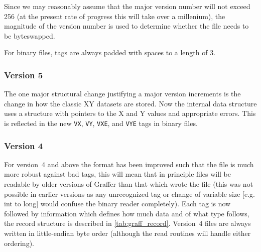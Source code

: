 \documentclass[english]{article}
\begin{document}
Since we may reasonably assume that the major version number will not
exceed 256 (at the present rate of progress this will take over a
millenium), the magnitude of the version number is used to determine
whether the file needs to be byteswapped.

For binary files, tags are always padded with spaces to a length
of 3. 

\subsubsection{Version 5}
\label{sec:bin_v5}

The one major structural change justifying a major version increments
is the change in how the classic XY datasets are stored. Now the
internal data structure uses a structure with pointers to the X and Y
values and appropriate errors. This is reflected in the new \texttt{VX},
\texttt{VY}, \texttt{VXE}, and \texttt{VYE} tags in binary files.

\subsubsection{Version 4}
\label{sec:bin_v4}

For version~4 and above the format has been improved such that the file
is much more robust against bad tags, this will mean that in principle
files will be readable by older versions of Graffer than that which
wrote the file (this was not possible in earlier versions as any
unrecognized tag or change of variable size [e.g. int to long] would
confuse the binary reader completely). Each tag is
now followed by information which defines how much data and of what
type follows, the record structure is described in
\autoref{tab:graff_record}. Version~4 files are always written in
little-endian byte order (although the read routines will handle either
ordering).
\end{document}
